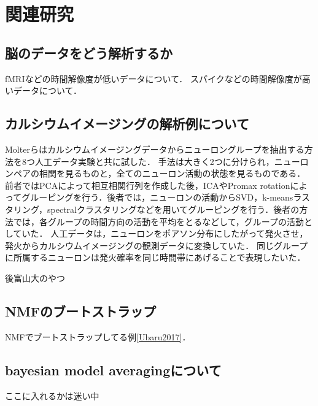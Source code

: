 \chapter{関連研究}
\section{脳のデータをどう解析するか}
fMRIなどの時間解像度が低いデータについて．
スパイクなどの時間解像度が高いデータについて．

\section{カルシウムイメージングの解析例について}
Molterらはカルシウムイメージングデータからニューロングループを抽出する方法を8つ人工データ実験と共に試した\cite{Molter2018}．
手法は大きく2つに分けられ，ニューロンペアの相関を見るものと，全てのニューロン活動の状態を見るものである．
前者ではPCAによって相互相関行列を作成した後，ICAやPromax rotationによってグルーピングを行う．後者では，ニューロンの活動からSVD，k-meansラスタリング，spectralクラスタリングなどを用いてグルーピングを行う．後者の方法では，各グループの時間方向の活動を平均をとるなどして，グループの活動としていた．
人工データは，ニューロンをポアソン分布にしたがって発火させ，発火からカルシウムイメージングの観測データに変換していた．
同じグループに所属するニューロンは発火確率を同じ時間帯にあげることで表現したいた．

後富山大のやつ

\section{NMFのブートストラップ}
NMFでブートストラップしてる例\ref{Ubaru2017}．

\section{bayesian model averagingについて}
ここに入れるかは迷い中
